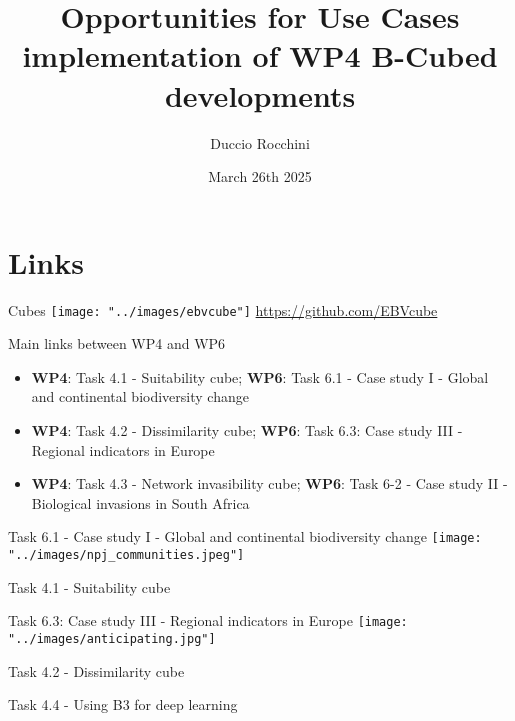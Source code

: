 \documentclass{beamer}
\title{Opportunities for Use Cases implementation of WP4 B-Cubed developments}
\author{Duccio Rocchini}
\date{March 26th 2025}
\institute{
\texttt{[image: "../images/b3logo.png"]}
}
\begin{document}
\maketitle


\section{Links}

\begin{frame}{Cubes}
\centering
\texttt{[image: "../images/ebvcube"]}
\bigskip
\url{https://github.com/EBVcube}
\end{frame}

\begin{frame}{Main links between WP4 and WP6}

\begin{itemize}
	\item \textbf{WP4}: Task 4.1 - Suitability cube; \textbf{WP6}: Task 6.1 - Case study I - Global and continental biodiversity change
	\pause \item \textbf{WP4}: Task 4.2 - Dissimilarity cube; \textbf{WP6}: Task 6.3: Case study III - Regional indicators in Europe
	\pause \item \textbf{WP4}:  Task 4.3 - Network invasibility cube; \textbf{WP6}: Task 6-2 - Case study II - Biological invasions in South Africa 
\end{itemize}
\end{frame}


\begin{frame}{Task 6.1 - Case study I - Global and continental biodiversity change}
\centering
\texttt{[image: "../images/npj\_communities.jpeg"]}

\smallskip
\scriptsize{Task 4.1 - Suitability cube}
\end{frame}


\begin{frame}{Task 6.3: Case study III - Regional indicators in Europe}
\centering 
\texttt{[image: "../images/anticipating.jpg"]}

\smallskip
\scriptsize{Task 4.2 - Dissimilarity cube}

\scriptsize{Task 4.4 - Using B3 for deep learning}
\end{frame}
\end{document}
